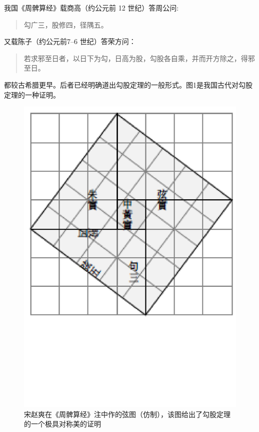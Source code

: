 \documentclass[UTF8]{ctexart} %
\newenvironment{myquote}	
	{\begin{quote}\kaishu\zihao{-5}}
	{\end{quote}}
\begin{document}
我国《周髀算经》载商高（约公元前 12 世纪）答周公问:
\begin{myquote}
	 勾广三，股修四，径隅五。
\end{myquote}
又载陈子（约公元前7--6 世纪）答荣方问：
\begin{myquote}
	 若求邪至日者，以日下为勾，日高为股，勾股各自乘，并而开方除之，得邪至日。
\end{myquote}
都较古希腊更早。后者已经明确道出勾股定理的一般形式。图1是我国古代对勾股定理的一种证明\cite{quanjing}。
\begin{figure}[ht]
	\centering
	\includegraphics[scale=0.15]{xiantu.pdf}	%
	\caption{宋赵爽在《周髀算经》注中作的弦图（仿制），该图给出了勾股定理的一个极具对称美的证明}
	\label{fig:xiantu}
\end{figure}
\end{document}
